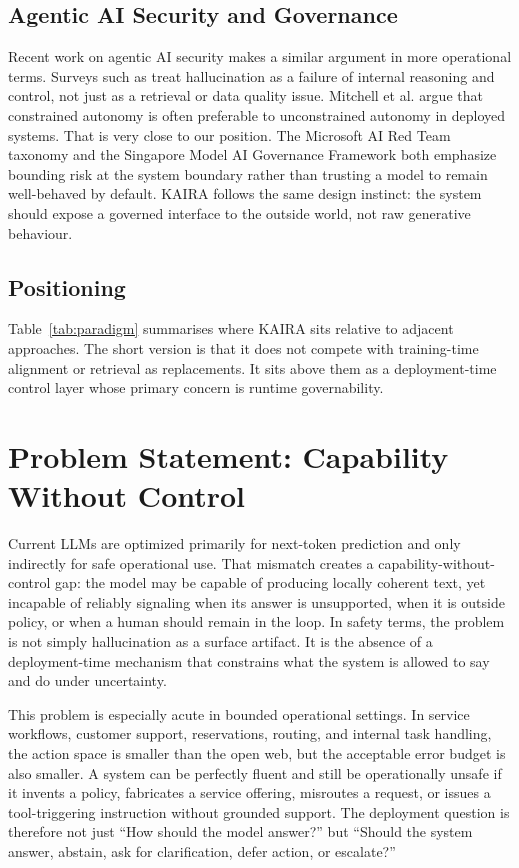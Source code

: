 \documentclass[11pt,a4paper]{article}
\begin{document}
\subsection{Agentic AI Security and Governance}
Recent work on agentic AI security makes a similar argument in more operational terms. Surveys such as \cite{deng2024agents, he2024security} treat hallucination as a failure of internal reasoning and control, not just as a retrieval or data quality issue. Mitchell et al. \cite{mitchell2025autonomous} argue that constrained autonomy is often preferable to unconstrained autonomy in deployed systems. That is very close to our position. The Microsoft AI Red Team taxonomy \cite{bryan2024taxonomy} and the Singapore Model AI Governance Framework \cite{imda2026governance} both emphasize bounding risk at the system boundary rather than trusting a model to remain well-behaved by default. KAIRA follows the same design instinct: the system should expose a governed interface to the outside world, not raw generative behaviour.

\subsection{Positioning}
Table~\ref{tab:paradigm} summarises where KAIRA sits relative to adjacent approaches. The short version is that it does not compete with training-time alignment or retrieval as replacements. It sits above them as a deployment-time control layer whose primary concern is runtime governability.

\section{Problem Statement: Capability Without Control}

Current LLMs are optimized primarily for next-token prediction and only indirectly for safe operational use. That mismatch creates a capability-without-control gap: the model may be capable of producing locally coherent text, yet incapable of reliably signaling when its answer is unsupported, when it is outside policy, or when a human should remain in the loop. In safety terms, the problem is not simply hallucination as a surface artifact. It is the absence of a deployment-time mechanism that constrains what the system is allowed to say and do under uncertainty.

This problem is especially acute in bounded operational settings. In service workflows, customer support, reservations, routing, and internal task handling, the action space is smaller than the open web, but the acceptable error budget is also smaller. A system can be perfectly fluent and still be operationally unsafe if it invents a policy, fabricates a service offering, misroutes a request, or issues a tool-triggering instruction without grounded support. The deployment question is therefore not just ``How should the model answer?'' but ``Should the system answer, abstain, ask for clarification, defer action, or escalate?''
\end{document}
